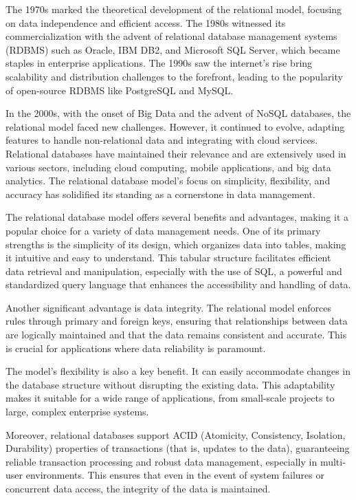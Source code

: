 The 1970s marked the theoretical development of the relational model, focusing on data independence and efficient access. The 1980s witnessed its commercialization with the advent of relational database management systems (RDBMS) such as Oracle, IBM DB2, and Microsoft SQL Server, which became staples in enterprise applications. The 1990s saw the internet's rise bring scalability and distribution challenges to the forefront, leading to the popularity of open-source RDBMS like PostgreSQL and MySQL.

In the 2000s, with the onset of Big Data and the advent of NoSQL databases, the relational model faced new challenges. However, it continued to evolve, adapting features to handle non-relational data and integrating with cloud services. Relational databases have maintained their relevance and are extensively used in various sectors, including cloud computing, mobile applications, and big data analytics. The relational database model's focus on simplicity, flexibility, and accuracy has solidified its standing as a cornerstone in data management.

The relational database model offers several benefits and advantages, making it a popular choice for a variety of data management needs. One of its primary strengths is the simplicity of its design, which organizes data into tables, making it intuitive and easy to understand. This tabular structure facilitates efficient data retrieval and manipulation, especially with the use of SQL, a powerful and standardized query language that enhances the accessibility and handling of data.

Another significant advantage is data integrity. The relational model enforces rules through primary and foreign keys, ensuring that relationships between data are logically maintained and that the data remains consistent and accurate. This is crucial for applications where data reliability is paramount.

The model's flexibility is also a key benefit. It can easily accommodate changes in the database structure without disrupting the existing data. This adaptability makes it suitable for a wide range of applications, from small-scale projects to large, complex enterprise systems.

Moreover, relational databases support ACID (Atomicity, Consistency, Isolation, Durability) properties of transactions (that is, updates to the data), guaranteeing reliable transaction processing and robust data management, especially in multi-user environments. This ensures that even in the event of system failures or concurrent data access, the integrity of the data is maintained.

